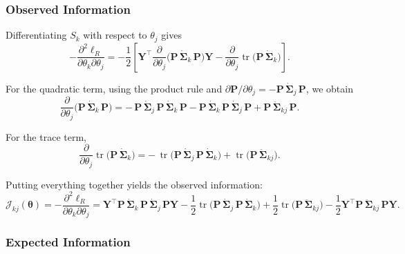 \documentclass[
  letterpaper,
  DIV=11,
  numbers=noendperiod]{scrartcl}
\begin{document}
\subsubsection{Observed Information}\label{observed-information}

Differentiating \(S_k\) with respect to \(\theta_j\) gives
\begin{equation}
-\frac{\partial^2 \ell_R}{\partial \theta_k \partial \theta_j}
=
-\frac{1}{2}
\left[
\symbf{Y}^\top
\frac{\partial}{\partial \theta_j}
\big(\symbf{P}\,\dot{\symbf{\Sigma}}_k\,\symbf{P}\big)
\symbf{Y}
-
\frac{\partial}{\partial \theta_j}
\operatorname{tr}\!\big(\symbf{P}\,\dot{\symbf{\Sigma}}_k\big)
\right].
\end{equation}

For the quadratic term, using the product rule and
\(\partial \symbf{P}/\partial \theta_j = -\symbf{P}\,\dot{\symbf{\Sigma}}_j\,\symbf{P}\),
we obtain \begin{equation}
\frac{\partial}{\partial \theta_j}
\big(\symbf{P}\,\dot{\symbf{\Sigma}}_k\,\symbf{P}\big)
=
-\,\symbf{P}\,\dot{\symbf{\Sigma}}_j\,\symbf{P}\,\dot{\symbf{\Sigma}}_k\,\symbf{P}
-
\symbf{P}\,\dot{\symbf{\Sigma}}_k\,\symbf{P}\,\dot{\symbf{\Sigma}}_j\,\symbf{P}
+
\symbf{P}\,\ddot{\symbf{\Sigma}}_{kj}\,\symbf{P}.
\end{equation}

For the trace term, \begin{equation}
\frac{\partial}{\partial \theta_j}
\operatorname{tr}\!\big(\symbf{P}\,\dot{\symbf{\Sigma}}_k\big)
=
-\,\operatorname{tr}\!\big(
\symbf{P}\,\dot{\symbf{\Sigma}}_j\,\symbf{P}\,\dot{\symbf{\Sigma}}_k
\big)
+
\operatorname{tr}\!\big(
\symbf{P}\,\ddot{\symbf{\Sigma}}_{kj}
\big).
\end{equation}

Putting everything together yields the observed information:
\begin{equation}
\mathcal{J}_{kj}(\symbf{\theta}) = -\frac{\partial^2 \ell_R}{\partial \theta_k \partial \theta_j}
=
\symbf{Y}^\top
\symbf{P}\,\dot{\symbf{\Sigma}}_k\,\symbf{P}\,\dot{\symbf{\Sigma}}_j\,\symbf{P}
\symbf{Y}
-\frac{1}{2}
\operatorname{tr}\!\big(
\symbf{P}\,\dot{\symbf{\Sigma}}_j\,\symbf{P}\,\dot{\symbf{\Sigma}}_k
\big)
+\frac{1}{2}
\operatorname{tr}\!\big(
\symbf{P}\,\ddot{\symbf{\Sigma}}_{kj}
\big)
- \frac{1}{2} \symbf{Y}^\top \symbf{P}\,\ddot{\symbf{\Sigma}}_{kj}\,\symbf{P}\symbf{Y}.
\end{equation}

\subsubsection{Expected Information}\label{expected-information}
\end{document}
